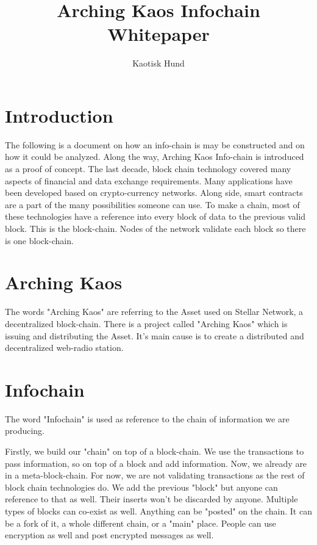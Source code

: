 \documentclass[10pt,a4paper]{paper}
\title{Arching Kaos Infochain Whitepaper}
\author{Kaotisk Hund}
\begin{document}
	\maketitle
	\begin{abstract}
		
	\end{abstract}
	\tableofcontents
	\section{Introduction}\label{Introduction}
	The following is a document on how an info-chain is may be constructed and on how it could be analyzed. Along the way, Arching Kaos Info-chain is introduced as a proof of concept. The last decade, block chain technology covered many aspects of financial and data exchange requirements. Many applications have been developed based on crypto-currency networks. Along side, smart contracts are a part of the many possibilities someone can use. To make a chain, most of these technologies have a reference into every block of data to the previous valid block. This is the block-chain. Nodes of the network validate each block so there is one block-chain.


	\section{Arching Kaos}\label{arching-kaos}
	The words "Arching Kaos" are referring to the Asset used on Stellar Network, a decentralized block-chain. There is a project called "Arching Kaos" which is issuing and distributing the Asset. It's main cause is to create a distributed and decentralized web-radio station.
	
	\section{Infochain}\label{infochain}
	The word "Infochain" is used as reference to the chain of information we are producing.
		
	Firstly, we build our "chain" on top of a block-chain. We use the transactions to pass information, so on top of a block and add information. Now, we already are in a meta-block-chain. For now, we are not validating transactions as the rest of block chain technologies do. We add the previous "block" but anyone can reference to that as well. Their inserts won't be discarded by anyone. Multiple types of blocks can co-exist as well. Anything can be "posted" on the chain. It can be a fork of it, a whole different chain, or a "main" place. People can use encryption as well and post encrypted messages as well.
	
\end{document}
